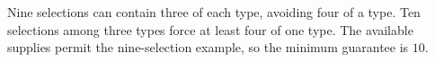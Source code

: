 Nine selections can contain three of each type, avoiding four of a type. Ten selections among three types force at least four of one type. The available supplies permit the nine-selection example, so the minimum guarantee is $\boxed{10}$.
